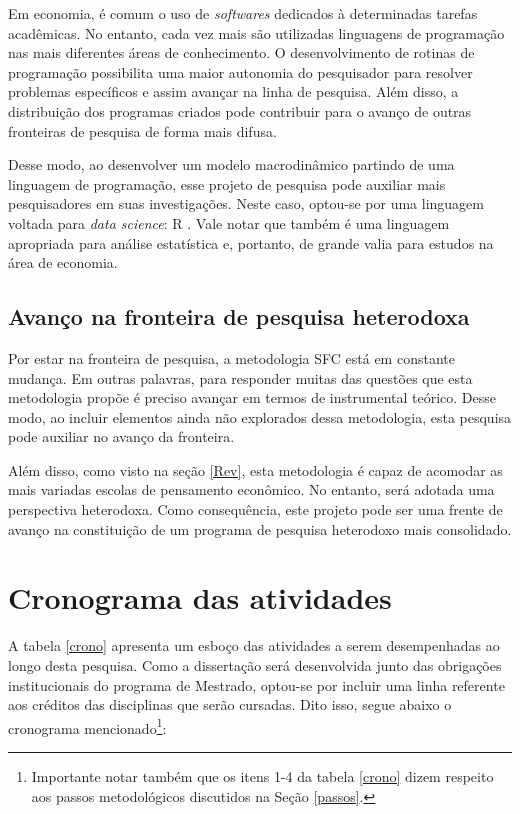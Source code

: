 \documentclass[12pt]{report}
\begin{document}
 Em economia, é comum o uso de \textit{softwares} dedicados à determinadas tarefas acadêmicas. No entanto, cada vez mais são utilizadas linguagens de programação nas mais diferentes áreas de conhecimento. O desenvolvimento de rotinas de programação possibilita uma maior autonomia do pesquisador para resolver problemas específicos e assim avançar na linha de pesquisa. Além disso, a distribuição dos programas criados pode contribuir para o avanço de outras fronteiras de pesquisa de forma mais difusa.
 
 Desse modo,  ao desenvolver um modelo macrodinâmico partindo de uma linguagem de programação, esse projeto de pesquisa pode auxiliar mais pesquisadores em suas investigações. Neste caso, optou-se por uma linguagem voltada para \textit{data science}: R \cite{RSoftware}. Vale notar que também é uma linguagem apropriada para  análise estatística e, portanto,  de grande valia para estudos na área de economia.

\section{Avanço na fronteira de pesquisa heterodoxa}

Por estar na fronteira de pesquisa, a metodologia SFC está em constante mudança. Em outras palavras, para responder muitas das questões que esta metodologia propõe é preciso avançar em termos de instrumental teórico. Desse modo, ao incluir elementos ainda não explorados dessa metodologia, esta pesquisa pode auxiliar no avanço da fronteira. 

Além disso, como visto na seção \ref{Rev}, esta metodologia é capaz de acomodar as mais variadas escolas de pensamento econômico. No entanto, será adotada uma perspectiva heterodoxa. Como consequência, este projeto pode ser uma frente de avanço na constituição de um programa de pesquisa heterodoxo mais consolidado. 



{\let\clearpage\relax \chapter{Cronograma das atividades}\label{cronograma}}

A tabela \ref{crono} apresenta um esboço das atividades a serem desempenhadas ao longo desta pesquisa. Como a dissertação será desenvolvida junto das obrigações institucionais do programa de Mestrado, optou-se por incluir uma linha referente aos créditos das disciplinas que serão cursadas. Dito isso, segue abaixo o cronograma mencionado\footnote{Importante notar também que os itens 1-4 da tabela \ref{crono} dizem respeito aos passos metodológicos discutidos na Seção \ref{passos}.
}:
\end{document}

